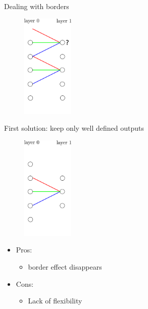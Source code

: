 \documentclass[xcolor=pdftex,dvipsnames,table,mathserif]{beamer}
\begin{document}
\begin{frame}{Dealing with borders}

  \begin{figure}
    \includegraphics[height=5cm]{conv_border_effect}
  \end{figure}

\end{frame}

\begin{frame}{First solution: keep only well defined outputs}

  \begin{figure}
    \includegraphics[height=5cm]{conv_border_effect2}
  \end{figure}

\begin{itemize}
\item Pros:
  \begin{itemize}
  \item border effect disappears
  \end{itemize}
\item Cons:
  \begin{itemize}
  \item Lack of flexibility
  \end{itemize}
\end{itemize}

\end{frame}
\end{document}
